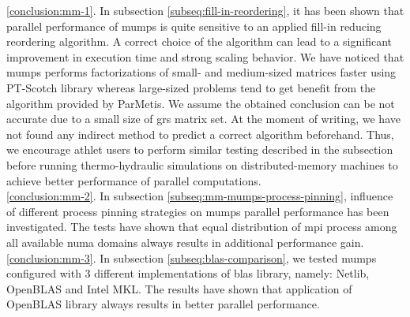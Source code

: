 \ref{conclusion:mm-1}. In subsection \ref{subseq:fill-in-reordering}, it has been shown that parallel performance of \acrshort{mumps} is quite sensitive to an applied fill-in reducing reordering algorithm. A correct choice of the algorithm can lead to a significant improvement in execution time and strong scaling behavior. We have noticed that \acrshort{mumps} performs factorizations of small- and medium-sized matrices faster using PT-Scotch library whereas large-sized problems tend to get benefit from the algorithm provided by ParMetis. We assume the obtained conclusion can be not accurate due to a small size of \acrshort{grs} matrix set. At the moment of writing, we have not found any indirect method to predict a correct algorithm beforehand. Thus, we encourage \acrshort{athlet} users to perform similar testing described in the subsection before running thermo-hydraulic simulations on distributed-memory machines to achieve better performance of parallel computations.\\




\ref{conclusion:mm-2}. In subsection \ref{subseq:mm-mumps-process-pinning}, influence of different process pinning strategies on \acrshort{mumps} parallel performance has been investigated. The tests have shown that equal distribution of \acrshort{mpi} process among all available \acrshort{numa} domains always results in additional performance gain.\\ %


\ref{conclusion:mm-3}. 
In subsection \ref{subseq:blas-comparison},
we tested \acrshort{mumps} configured with 3 different implementations of \acrshort{blas} library, namely: Netlib, OpenBLAS and Intel MKL. The results have shown that application of OpenBLAS library always results in better parallel performance.\\



